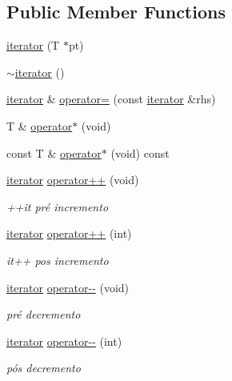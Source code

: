 \subsection*{Public Member Functions}
\begin{DoxyCompactItemize}
\item 
\hyperlink{classsc_1_1vector_1_1iterator_ad9cff55254aef8c14bd6803dfa8b2e03}{iterator} (T $\ast$pt)
\item 
\hyperlink{classsc_1_1vector_1_1iterator_ac8fb8f5e6b6a8eab9ab808e90f96c01d}{$\sim$iterator} ()
\item 
\hyperlink{classsc_1_1vector_1_1iterator}{iterator} \& \hyperlink{classsc_1_1vector_1_1iterator_a744168c87e46c6e962c30eb3ee3299ab}{operator=} (const \hyperlink{classsc_1_1vector_1_1iterator}{iterator} \&rhs)
\item 
T \& \hyperlink{classsc_1_1vector_1_1iterator_a195ce221fcaf875739014d681073eaeb}{operator$\ast$} (void)
\item 
const T \& \hyperlink{classsc_1_1vector_1_1iterator_acc1afb3186e955cd261c757dae2b587a}{operator$\ast$} (void) const
\item 
\hyperlink{classsc_1_1vector_1_1iterator}{iterator} \hyperlink{classsc_1_1vector_1_1iterator_a0579f178e03522ffa042fdbf49cbf383}{operator++} (void)
\begin{DoxyCompactList}\small\item\em ++it pré incremento \end{DoxyCompactList}\item 
\hyperlink{classsc_1_1vector_1_1iterator}{iterator} \hyperlink{classsc_1_1vector_1_1iterator_a7e58b618eb71b340b74311eda1271bc9}{operator++} (int)
\begin{DoxyCompactList}\small\item\em it++ pos incremento \end{DoxyCompactList}\item 
\hyperlink{classsc_1_1vector_1_1iterator}{iterator} \hyperlink{classsc_1_1vector_1_1iterator_a8be1d69a3f7f0d220487463a60a5efd4}{operator-\/-\/} (void)
\begin{DoxyCompactList}\small\item\em pré decremento \end{DoxyCompactList}\item 
\hyperlink{classsc_1_1vector_1_1iterator}{iterator} \hyperlink{classsc_1_1vector_1_1iterator_ab4a76691eb8ba0da9e014fa49f4cce4f}{operator-\/-\/} (int)
\begin{DoxyCompactList}\small\item\em pós decremento \end{DoxyCompactList}\item 

\end{DoxyCompactItemize}
